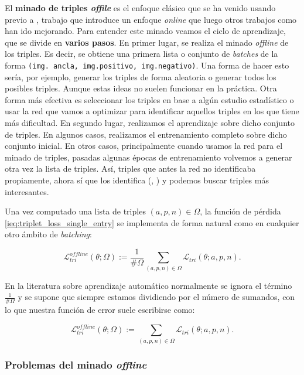 El \textbf{minado de triples \textit{offile}} es el enfoque clásico que se ha venido usando previo a \cite{informatica:facenet}, trabajo que introduce un enfoque \textit{online} que luego otros trabajos como \cite{informatica:principal} han ido mejorando. Para entender este minado veamos el ciclo de aprendizaje, que se divide en \textbf{varios pasos}. En primer lugar, se realiza el minado \textit{offline} de los triples. Es decir, se obtiene una primera lista o conjunto de \textit{batches} de la forma \lstinline{(img. ancla, img.positivo, img.negativo)}. Una forma de hacer esto sería, por ejemplo, generar los triples de forma aleatoria o generar todos los posibles triples. Aunque estas ideas no suelen funcionar en la práctica. Otra forma más efectiva es seleccionar los triples en base a algún estudio estadístico o usar la red que vamos a optimizar para identificar aquellos triples en los que tiene más dificultad. En segundo lugar, realizamos el aprendizaje sobre dicho conjunto de triples. En algunos casos, realizamos el entrenamiento completo sobre dicho conjunto inicial. En otros casos, principalmente cuando usamos la red para el minado de triples, pasadas algunas épocas de entrenamiento volvemos a generar otra vez la lista de triples. Así, triples que antes la red no identificaba propiamente, ahora sí que los identifica (, \cite{informatica:facenet}) y podemos buscar triples más interesantes.

Una vez computado una lista de triples $(a, p, n) \in \Omega$, la función de pérdida \eqref{ieq:triplet_loss_single_entry} se implementa de forma natural como en cualquier otro ámbito de \textit{batching}:

\begin{equation}
	\mathcal{L}_{tri}^{offline}(\theta; \Omega) := \frac{1}{\#\Omega} \sum_{(a, p, n) \in \Omega} \mathcal{L}_{tri}(\theta; a, p, n).
\end{equation}

En la literatura sobre aprendizaje automático normalmente se ignora el término $\frac{1}{\#\Omega}$ y se supone que siempre estamos dividiendo por el número de sumandos, con lo que nuestra función de error suele escribirse como:

\begin{equation}
	\mathcal{L}_{tri}^{offline}(\theta; \Omega) := \sum_{(a, p, n) \in \Omega} \mathcal{L}_{tri}(\theta; a, p, n).
\end{equation}

\subsubsection{Problemas del minado \textit{offline}}

